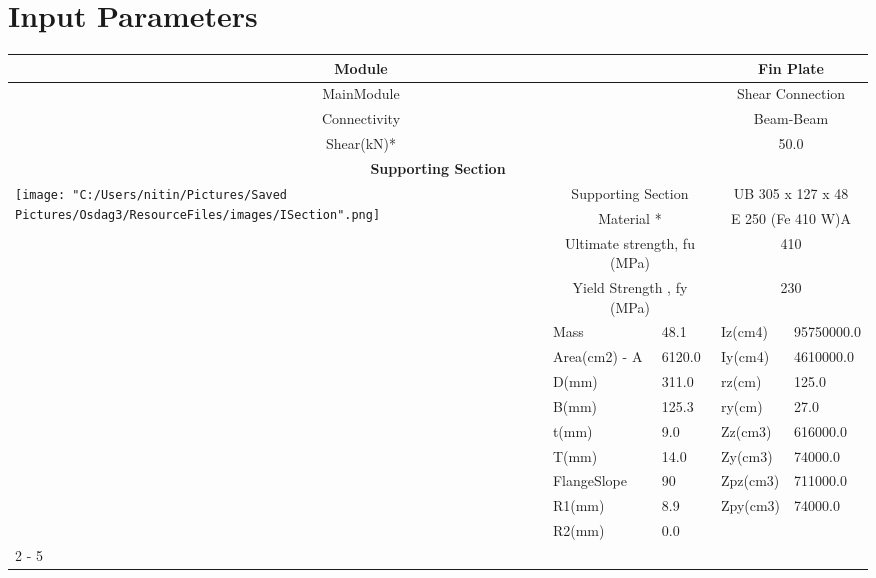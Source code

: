 \documentclass{article}%
\begin{document}
%
\normalsize%
\pagestyle{header}%
\section{Input Parameters}%
\label{sec:InputParameters}%
\renewcommand{\arraystretch}{1.2}%
\begin{longtable}{|p{5cm}|p{2cm}|p{2cm}|p{2cm}|p{5cm}|}%
\hline%
\hline%
\multicolumn{3}{|c|}{Module}&\multicolumn{2}{|c|}{Fin Plate}\\%
\hline%
\hline%
\multicolumn{3}{|c|}{MainModule}&\multicolumn{2}{|c|}{Shear Connection}\\%
\hline%
\hline%
\multicolumn{3}{|c|}{Connectivity}&\multicolumn{2}{|c|}{Beam{-}Beam}\\%
\hline%
\hline%
\multicolumn{3}{|c|}{Shear(kN)*}&\multicolumn{2}{|c|}{50.0}\\%
\hline%
\hline%
\multicolumn{5}{|c|}{\textbf{Supporting Section}}\\%
\hline%
\hline%
\multirow{13}{*}{\texttt{[image: "C:/Users/nitin/Pictures/Saved Pictures/Osdag3/ResourceFiles/images/ISection".png]}}&\multicolumn{2}{|c|}{Supporting Section}&\multicolumn{2}{|c|}{UB 305 x 127 x 48}\\%
\cline{2%
-%
5}%
&\multicolumn{2}{|c|}{Material *}&\multicolumn{2}{|c|}{E 250 (Fe 410 W)A}\\%
\cline{2%
-%
5}%
&\multicolumn{2}{|c|}{Ultimate strength, fu (MPa)}&\multicolumn{2}{|c|}{410}\\%
\cline{2%
-%
5}%
&\multicolumn{2}{|c|}{Yield Strength , fy (MPa)}&\multicolumn{2}{|c|}{230}\\%
\cline{2%
-%
5}%
&Mass&48.1&Iz(cm4)&95750000.0\\%
\cline{2%
-%
5}%
&Area(cm2) {-} A&6120.0&Iy(cm4)&4610000.0\\%
\cline{2%
-%
5}%
&D(mm)&311.0&rz(cm)&125.0\\%
\cline{2%
-%
5}%
&B(mm)&125.3&ry(cm)&27.0\\%
\cline{2%
-%
5}%
&t(mm)&9.0&Zz(cm3)&616000.0\\%
\cline{2%
-%
5}%
&T(mm)&14.0&Zy(cm3)&74000.0\\%
\cline{2%
-%
5}%
&FlangeSlope&90&Zpz(cm3)&711000.0\\%
\cline{2%
-%
5}%
&R1(mm)&8.9&Zpy(cm3)&74000.0\\%
\cline{2%
-%
5}%
&R2(mm)&0.0&&\\%
\cline{2%
-%
5}%
\hline%
\multicolumn{5}{|c|}{\textbf{Supported Section}}\\%
\hline%
\hline%

\end{longtable}
\end{document}

